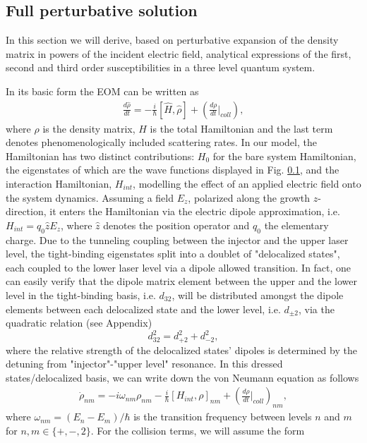 \documentclass[journal]{IEEEtran}
\begin{document}
\subsection{Full perturbative solution}
In this section we will derive, based on perturbative expansion of the density matrix in powers of the incident electric field, analytical expressions of the first, second and third order susceptibilities in a three level quantum system. 

In its basic form the EOM can be written as 
\begin{align}
\frac{d\hat\rho}{dt} = -\frac{i}{\hbar}[\hat H,\hat\rho] + (\frac{d \rho }{dt}|_{coll}),
\end{align}
where $\rho$ is the density matrix, $H$ is the total Hamiltonian and the last term denotes phenomenologically included scattering rates. In our model, the Hamiltonian has two distinct contributions: $H_0$ for the bare system Hamiltonian, the eigenstates of which are the wave functions displayed in Fig. \ref{}, and the interaction Hamiltonian, $H_{int}$, modelling the effect of an applied electric field onto the system dynamics. Assuming a field $E_z$, polarized along the growth $z$-direction, it enters the Hamiltonian via the electric dipole approximation, i.e. $H_{int} = q_0 \hat{z} E_z$, where $\hat{z}$ denotes the position operator and $q_0$ the elementary charge. Due to the tunneling coupling between the injector and the upper laser level, the tight-binding eigenstates split into a doublet of "delocalized states", each coupled to the lower laser level via a dipole allowed transition. In fact, one can easily verify that the dipole matrix element between the upper and the lower level in the tight-binding basis, i.e. $d_{32}$, will be distributed amongst the dipole elements between each delocalized state and the lower level, i.e. $d_{\pm2}$, via the quadratic relation (see Appendix)
\begin{equation}
d_{32}^2 =d_{+2}^2+d_{-2}^2,
\end{equation} 
where the relative strength of the delocalized states' dipoles is determined by the detuning from "injector"-"upper level" resonance. In this dressed states/delocalized basis, we can write down the von Neumann equation as follows
\begin{align}
\label{eq:EOM_nm}
\dot{\rho}_{nm} = -i\omega_{nm}\rho_{nm}  - \frac{i}{\hbar} [H_{int},\rho]_{nm} + (\frac{d \rho }{dt}|_{coll})_{nm},
\end{align}
where $\omega_{nm} = (E_n-E_m)/\hbar$ is the transition frequency between levels $n$ and $m$ for $n,m \in\{+,-,2\}$. For the collision terms, we will assume the form 
\end{document}
